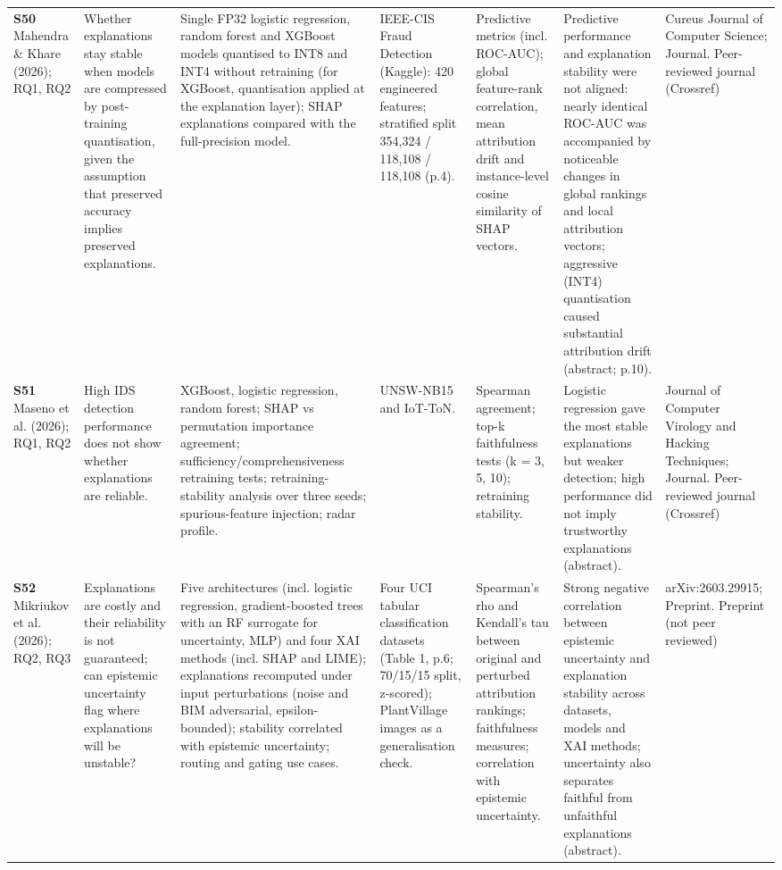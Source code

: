 \begin{longtable}{@{}P{1.55cm}P{2.9cm}P{4.5cm}P{3.2cm}P{3.4cm}P{4.6cm}P{3.6cm}@{}}
\textbf{S50} \cite{S50} Mahendra \& Khare (2026); RQ1, RQ2 & Whether explanations stay stable when models are compressed by post-training quantisation, given the assumption that preserved accuracy implies preserved explanations. & Single FP32 logistic regression, random forest and XGBoost models quantised to INT8 and INT4 without retraining (for XGBoost, quantisation applied at the explanation layer); SHAP explanations compared with the full-precision model. & IEEE-CIS Fraud Detection (Kaggle): 420 engineered features; stratified split 354,324 /\allowbreak{} 118,108 /\allowbreak{} 118,108 (p.4). & Predictive metrics (incl. ROC-AUC); global feature-rank correlation, mean attribution drift and instance-level cosine similarity of SHAP vectors. & Predictive performance and explanation stability were not aligned: nearly identical ROC-AUC was accompanied by noticeable changes in global rankings and local attribution vectors; aggressive (INT4) quantisation caused substantial attribution drift (abstract; p.10). & Cureus Journal of Computer Science; Journal. Peer-reviewed journal (Crossref) \\
\textbf{S51} \cite{S51} Maseno et al. (2026); RQ1, RQ2 & High IDS detection performance does not show whether explanations are reliable. & XGBoost, logistic regression, random forest; SHAP vs permutation importance agreement; sufficiency/\allowbreak{}comprehensiveness retraining tests; retraining-stability analysis over three seeds; spurious-feature injection; radar profile. & UNSW-NB15 and IoT-ToN. & Spearman agreement; top-k faithfulness tests (k = 3, 5, 10); retraining stability. & Logistic regression gave the most stable explanations but weaker detection; high performance did not imply trustworthy explanations (abstract). & Journal of Computer Virology and Hacking Techniques; Journal. Peer-reviewed journal (Crossref) \\
\textbf{S52} \cite{S52} Mikriukov et al. (2026); RQ2, RQ3 & Explanations are costly and their reliability is not guaranteed; can epistemic uncertainty flag where explanations will be unstable? & Five architectures (incl. logistic regression, gradient-boosted trees with an RF surrogate for uncertainty, MLP) and four XAI methods (incl. SHAP and LIME); explanations recomputed under input perturbations (noise and BIM adversarial, epsilon-bounded); stability correlated with epistemic uncertainty; routing and gating use cases. & Four UCI tabular classification datasets (Table 1, p.6; 70/\allowbreak{}15/\allowbreak{}15 split, z-scored); PlantVillage images as a generalisation check. & Spearman's rho and Kendall's tau between original and perturbed attribution rankings; faithfulness measures; correlation with epistemic uncertainty. & Strong negative correlation between epistemic uncertainty and explanation stability across datasets, models and XAI methods; uncertainty also separates faithful from unfaithful explanations (abstract). & arXiv:2603.29915; Preprint. Preprint (not peer reviewed) \\

\end{longtable}
